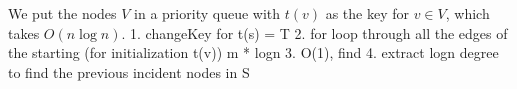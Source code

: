 \documentclass{article}
\begin{document}
We put the nodes $V$ in a priority queue with $t(v)$ as the key for $v \in V$, which takes $O(n\log{n})$. 
    1. changeKey for t(s) = T
    2. for loop through all the edges of the starting (for initialization t(v)) m * logn
    3. O(1), find
    4. extract logn degree to find the previous incident nodes in S
 
\end{document}
